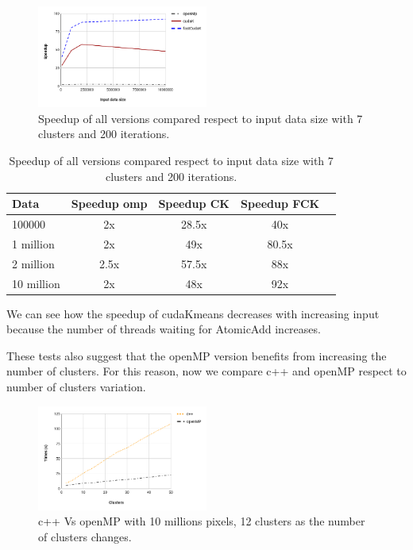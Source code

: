 \documentclass[10pt,twocolumn,letterpaper]{article}
\begin{document}
\begin{figure}[H]
\begin{center}
\includegraphics[width=0.5\textwidth]{latex/2s.png}
\caption{Speedup of all versions compared respect to input data size with 7 clusters and 200 iterations.}
\label{etichetta}
\end{center}
\end{figure}

\begin{table}[H]
\begin{center}
\begin{tabular}{|l|c|c|c|c|}
\hline
Data & Speedup omp & Speedup CK & Speedup FCK\\
\hline\hline
100000 & 2x & 28.5x & 40x \\
1 million & 2x & 49x & 80.5x \\
2 million & 2.5x & 57.5x & 88x \\
10 million & 2x & 48x & 92x\\
\hline
\end{tabular}
\end{center}
\caption{Speedup of all versions compared respect to input data size with 7 clusters and 200 iterations.}
\end{table}


We can see how the speedup of cudaKmeans decreases with increasing input because the number of threads waiting for AtomicAdd increases.

These tests also suggest that the openMP version benefits from increasing the number of clusters.
For this reason, now we compare c++ and openMP respect to number of clusters variation.


\begin{figure}[H]
\begin{center}
\includegraphics[width=0.5\textwidth]{latex/6.png}
\caption{c++ Vs openMP with 10 millions pixels, 12 clusters as the number of clusters changes.}
\label{etichetta}
\end{center}
\end{figure}
\end{document}
